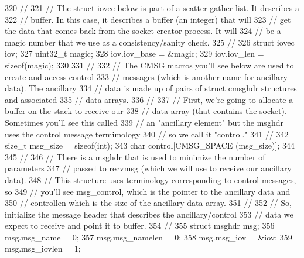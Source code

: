 \begin{DoxyCode}
320       \textcolor{comment}{//}
321       \textcolor{comment}{// The struct iovec below is part of a scatter-gather list.  It describes a}
322       \textcolor{comment}{// buffer.  In this case, it describes a buffer (an integer) that will}
323       \textcolor{comment}{// get the data that comes back from the socket creator process.  It will}
324       \textcolor{comment}{// be a magic number that we use as a consistency/sanity check.}
325       \textcolor{comment}{//}
326       \textcolor{keyword}{struct }iovec iov;
327       uint32\_t magic;
328       iov.iov\_base = &magic;
329       iov.iov\_len = \textcolor{keyword}{sizeof}(magic);
330 
331       \textcolor{comment}{//}
332       \textcolor{comment}{// The CMSG macros you'll see below are used to create and access control}
333       \textcolor{comment}{// messages (which is another name for ancillary data).  The ancillary}
334       \textcolor{comment}{// data is made up of pairs of struct cmsghdr structures and associated}
335       \textcolor{comment}{// data arrays.}
336       \textcolor{comment}{//}
337       \textcolor{comment}{// First, we're going to allocate a buffer on the stack to receive our}
338       \textcolor{comment}{// data array (that contains the socket).  Sometimes you'll see this called}
339       \textcolor{comment}{// an "ancillary element" but the msghdr uses the control message termimology}
340       \textcolor{comment}{// so we call it "control."}
341       \textcolor{comment}{//}
342       \textcolor{keywordtype}{size\_t} msg\_size = \textcolor{keyword}{sizeof}(int);
343       \textcolor{keywordtype}{char} control[CMSG\_SPACE (msg\_size)];
344 
345       \textcolor{comment}{//}
346       \textcolor{comment}{// There is a msghdr that is used to minimize the number of parameters}
347       \textcolor{comment}{// passed to recvmsg (which we will use to receive our ancillary data).}
348       \textcolor{comment}{// This structure uses terminology corresponding to control messages, so}
349       \textcolor{comment}{// you'll see msg\_control, which is the pointer to the ancillary data and}
350       \textcolor{comment}{// controllen which is the size of the ancillary data array.}
351       \textcolor{comment}{//}
352       \textcolor{comment}{// So, initialize the message header that describes the ancillary/control}
353       \textcolor{comment}{// data we expect to receive and point it to buffer.}
354       \textcolor{comment}{//}
355       \textcolor{keyword}{struct }msghdr msg;
356       msg.msg\_name = 0;
357       msg.msg\_namelen = 0;
358       msg.msg\_iov = &iov;
359       msg.msg\_iovlen = 1;

\end{DoxyCode}
